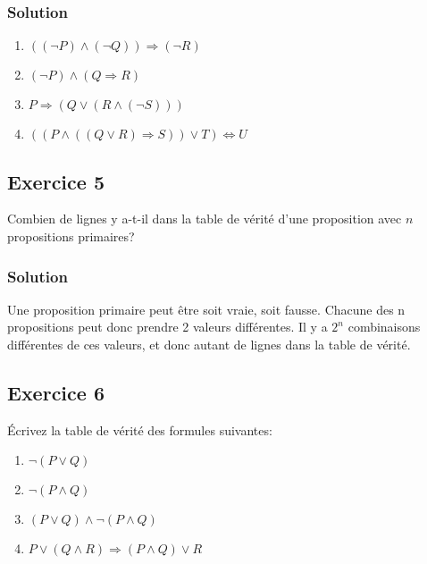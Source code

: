 \subsubsection*{Solution}
    \begin{enumerate}
        \item $((\neg P) \land (\neg Q)) \Rightarrow (\neg R)$
        \item $(\neg P) \land (Q \Rightarrow R)$
        \item $P \Rightarrow (Q \lor (R \land (\neg S)))$
        \item $((P \land ((Q \lor R) \Rightarrow S)) \lor T) \Leftrightarrow U$
    \end{enumerate}


\subsection*{Exercice 5}
Combien de lignes y a-t-il dans la table de vérité d'une proposition avec
$n$ propositions primaires?


\subsubsection*{Solution}

    Une proposition primaire peut être soit vraie, soit fausse.
    Chacune des n propositions peut donc prendre 2 valeurs différentes.
    Il y a $2^n$ combinaisons différentes de ces valeurs, et donc autant de lignes dans la table de vérité.

\subsection*{Exercice 6}
Écrivez la table de vérité des formules suivantes:
\begin{enumerate}
	\item $\neg (P \lor Q)$
	\item $\neg (P \land Q)$
	\item $(P \lor Q) \land \neg(P \land Q)$
	\item $P \lor (Q \land R) \Rightarrow (P \land Q) \lor R$
\end{enumerate}


